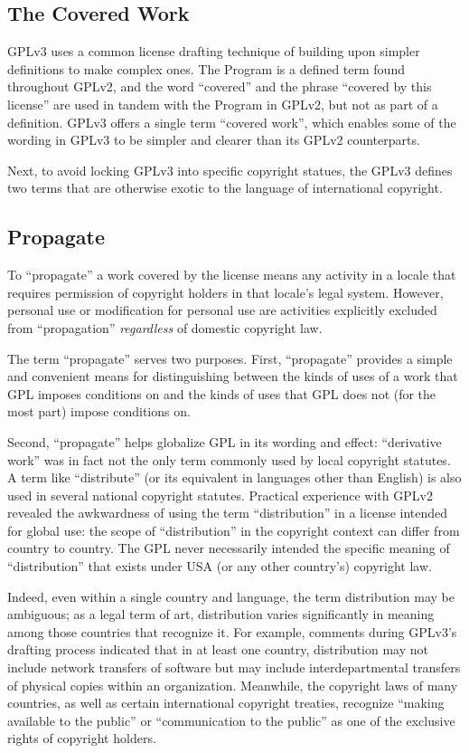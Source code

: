 \subsection{The Covered Work}

GPLv3 uses a common license drafting technique of building upon simpler
definitions to make complex ones.  The Program is a defined term found
throughout GPLv2, and the word ``covered'' and the phrase ``covered by this
license'' are used in tandem with the Program in GPLv2, but not as part of a
definition.  GPLv3 offers a single term ``covered work'', which enables some
of the wording in GPLv3 to be simpler and clearer than its GPLv2
counterparts.

Next, to avoid locking GPLv3 into specific copyright statues, the GPLv3
defines two terms that are otherwise exotic to the language of international
copyright.

\subsection{Propagate}

To ``propagate'' a work covered by the license means any activity in a locale
that requires permission of copyright holders in that locale's legal system.
However, personal use or modification for personal use are activities explicitly
excluded from ``propagation'' \textit{regardless} of domestic copyright law.

The term ``propagate'' serves two purposes.  First, ``propagate'' provides a
simple and convenient means for distinguishing between the kinds of uses of a
work that GPL imposes conditions on and the kinds of uses that GPL does not
(for the most part) impose conditions on.

Second, ``propagate'' helps globalize GPL in its wording and effect:
``derivative work'' was in fact not the only term commonly used by local
copyright statutes.  A term like ``distribute'' (or its equivalent in
languages other than English) is also used in several national copyright
statutes.  Practical experience with GPLv2 revealed the awkwardness of using
the term ``distribution'' in a license intended for global use: the scope of
``distribution'' in the copyright context can differ from country to country.
The GPL never necessarily intended the specific meaning of ``distribution''
that exists under USA (or any other country's) copyright law.

Indeed, even within a single country and language, the term distribution may
be ambiguous; as a legal term of art, distribution varies significantly in
meaning among those countries that recognize it.  For example, comments
during GPLv3's drafting process indicated that in at least one country,
distribution may not include network transfers of software but may include
interdepartmental transfers of physical copies within an organization.
Meanwhile, the copyright laws of many countries, as well as certain
international copyright treaties, recognize ``making available to the
public'' or ``communication to the public'' as one of the exclusive rights of
copyright holders.

